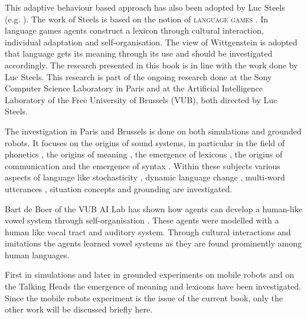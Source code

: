 This adaptive behaviour based approach has also been adopted by Luc Steels (e.g. \citealt{steels:1996a,steels:1996b,steels:1997b}). The work of Steels is based on the notion of {\scshape language games} \citep{wittgenstein:1958}. In language games agents construct a lexicon through cultural interaction, individual adaptation and self-organisation. The view of Wittgenstein is adopted that language gets its meaning through its use and should be investigated accordingly. The research presented in this book is in line with the work done by Luc Steels. This research is part of the ongoing research done at the Sony Computer Science Laboratory in Paris and at the Artificial Intelligence Laboratory of the Free University of Brussels (VUB), both directed by Luc Steels. 

The investigation in Paris and Brussels is done on both simulations and grounded robots. It focuses on the origins of sound systems, in particular in the field of phonetics \citep{deboer:1997,deboer:1999,oudeyer:1999}, the origins of meaning \citep{steels:1996b,steelsvogt:1997,dejongvogt:1998,vogt:1998a,dejong:1999}, the emergence of lexicons \citep{steels:1996a,steelskaplan:1998,kaplan:2000,vogt:1998b,vanlooveren:1999}, the origins of communication \citep{dejong:1999c,dejong:2000} and the emergence of syntax \citep{steels:2000a}. Within these subjects various aspects of language like stochasticity \citep{steelskaplan:1998,kaplan:2000}, dynamic language change \citep{steels:1997c,steelsmcintyre:1999,deboervogt:1999}, multi-word utterances \citep{vanlooveren:1999}, situation concepts \citep{dejong:99b} and grounding \citep{belpaeme:1998,steelsvogt:1997,steels:2000,kaplan:2000} are investigated.

Bart de Boer of the VUB AI Lab has shown how agents can develop a human-like vowel system through self-organisation \citep{deboer:1997,deboer:1999}. These agents were modelled with a human like vocal tract and auditory system. Through cultural interactions and imitations the agents learned vowel systems as they are found prominently among human languages. 


First in simulations \citep{steels:1996a,steels:1996b} and later in grounded experiments on mobile robots \citep{steelsvogt:1997,vogt:1998a,vogt:1998b,dejongvogt:1998} and on the Talking Heads \citep{belpaeme:1998,kaplan:2000,steels:2000} the emergence of meaning and lexicons have been investigated. Since the mobile robots experiment is the issue of the current book, only the other work will be discussed briefly here. 

